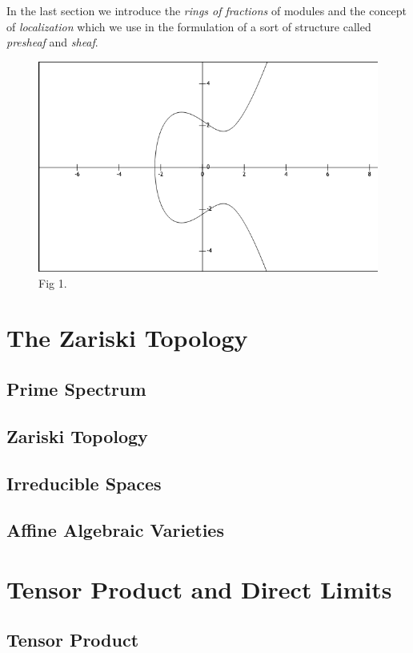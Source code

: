 \documentclass[]{report}
\begin{document}
    In the last section we introduce the \textit{rings of fractions} of modules and the concept of \textit{localization} which we use in the formulation of a sort of structure called \textit{presheaf} and \textit{sheaf}. 


\begin{figure}
  \includegraphics[width=\linewidth]{img/ell_curv1.png}
  \caption{Fig 1.}
  \label{fig:ell_curv1}
\end{figure}

\chapter {The Zariski Topology}
\section{Prime Spectrum}
\section{Zariski Topology}
\section{Irreducible Spaces}
\section{Affine Algebraic Varieties}


\chapter{Tensor Product and Direct Limits}
\section{Tensor Product}
\end{document}
